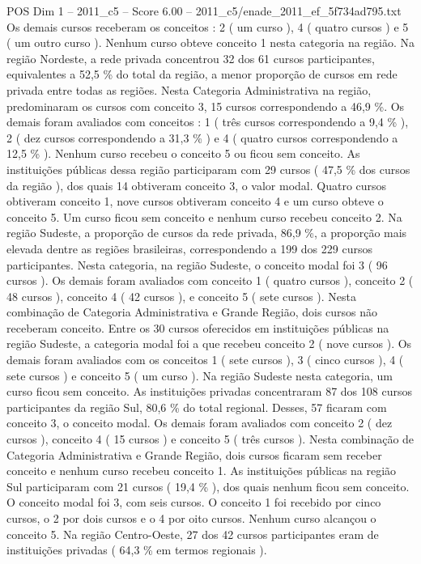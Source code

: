 \begin{textsample}{POS Dim 1 – 2011\_c5 – Score 6.00 – 2011\_c5/enade\_2011\_ef\_5f734ad795.txt}
Os demais cursos receberam os conceitos : 2 ( um curso ), 4 ( quatro cursos ) e 5 ( um outro curso ).
Nenhum curso obteve conceito 1 nesta categoria na região.
Na região Nordeste, a rede privada concentrou 32 dos 61 cursos participantes, equivalentes a 52,5 \% do total da região, a menor proporção de cursos em rede privada entre todas as regiões.
Nesta Categoria Administrativa na região, predominaram os cursos com conceito 3, 15 cursos correspondendo a 46,9 \%.
Os demais foram avaliados com conceitos : 1 ( três cursos correspondendo a 9,4 \% ), 2 ( dez cursos correspondendo a 31,3 \% ) e 4 ( quatro cursos correspondendo a 12,5 \% ).
Nenhum curso recebeu o conceito 5 ou ficou sem conceito.
As instituições públicas dessa região participaram com 29 cursos ( 47,5 \% dos cursos da região ), dos quais 14 obtiveram conceito 3, o valor modal.
Quatro cursos obtiveram conceito 1, nove cursos obtiveram conceito 4 e um curso obteve o conceito 5.
Um curso ficou sem conceito e nenhum curso recebeu conceito 2.
Na região Sudeste, a proporção de cursos da rede privada, 86,9 \%, a proporção mais elevada dentre as regiões brasileiras, correspondendo a 199 dos 229 cursos participantes.
Nesta categoria, na região Sudeste, o conceito modal foi 3 ( 96 cursos ).
Os demais foram avaliados com conceito 1 ( quatro cursos ), conceito 2 ( 48 cursos ), conceito 4 ( 42 cursos ), e conceito 5 ( sete cursos ).
Nesta combinação de Categoria Administrativa e Grande Região, dois cursos não receberam conceito.
Entre os 30 cursos oferecidos em instituições públicas na região Sudeste, a categoria modal foi a que recebeu conceito 2 ( nove cursos ).
Os demais foram avaliados com os conceitos 1 ( sete cursos ), 3 ( cinco cursos ), 4 ( sete cursos ) e conceito 5 ( um curso ).
Na região Sudeste nesta categoria, um curso ficou sem conceito.
As instituições privadas concentraram 87 dos 108 cursos participantes da região Sul, 80,6 \% do total regional.
Desses, 57 ficaram com conceito 3, o conceito modal.
Os demais foram avaliados com conceito 2 ( dez cursos ), conceito 4 ( 15 cursos ) e conceito 5 ( três cursos ).
Nesta combinação de Categoria Administrativa e Grande Região, dois cursos ficaram sem receber conceito e nenhum curso recebeu conceito 1.
As instituições públicas na região Sul participaram com 21 cursos ( 19,4 \% ), dos quais nenhum ficou sem conceito.
O conceito modal foi 3, com seis cursos.
O conceito 1 foi recebido por cinco cursos, o 2 por dois cursos e o 4 por oito cursos.
Nenhum curso alcançou o conceito 5.
Na região Centro-Oeste, 27 dos 42 cursos participantes eram de instituições privadas ( 64,3 \% em termos regionais ).

\end{textsample}
